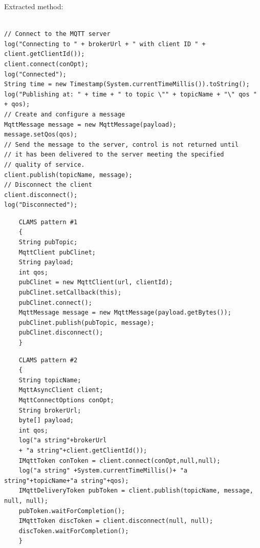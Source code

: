 
Extracted method:
\begin{lstlisting}

// Connect to the MQTT server
log("Connecting to " + brokerUrl + " with client ID " + client.getClientId());
client.connect(conOpt);
log("Connected");
String time = new Timestamp(System.currentTimeMillis()).toString();
log("Publishing at: " + time + " to topic \"" + topicName + "\" qos " + qos);
// Create and configure a message
MqttMessage message = new MqttMessage(payload);
message.setQos(qos);
// Send the message to the server, control is not returned until
// it has been delivered to the server meeting the specified
// quality of service.
client.publish(topicName, message);
// Disconnect the client
client.disconnect();
log("Disconnected");
\end{lstlisting}

\noindent

\begin{minipage}[t]{0.4\textwidth}
	\begin{lstlisting}
	CLAMS pattern #1
	{
	String pubTopic;
	MqttClient pubClinet;
	String payload;
	int qos;
	pubClinet = new MqttClient(url, clientId);
	pubClinet.setCallback(this);
	pubClinet.connect();
	MqttMessage message = new MqttMessage(payload.getBytes());
	pubClinet.publish(pubTopic, message);
	pubClinet.disconnect();
	}
	\end{lstlisting}
\end{minipage}
\hfill

\begin{minipage}[t]{0.5\textwidth}
	\begin{lstlisting}
	CLAMS pattern #2
	{
	String topicName;
	MqttAsyncClient client;
	MqttConnectOptions conOpt;
	String brokerUrl;
	byte[] payload;
	int qos;
	log("a string"+brokerUrl
	+ "a string"+client.getClientId());
	IMqttToken conToken = client.connect(conOpt,null,null);
	log("a string" +System.currentTimeMillis()+ "a string"+topicName+"a string"+qos);
	IMqttDeliveryToken pubToken = client.publish(topicName, message, null, null);
	pubToken.waitForCompletion();
	IMqttToken discToken = client.disconnect(null, null);
	discToken.waitForCompletion();
	}
	
	\end{lstlisting}
\end{minipage}


